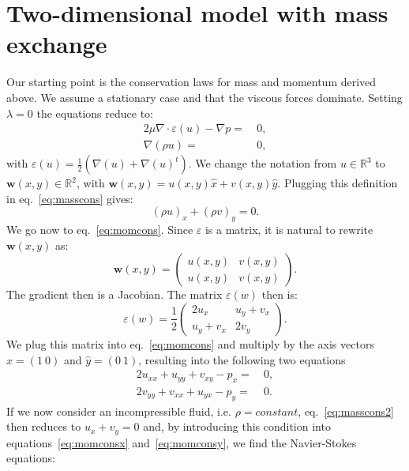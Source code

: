 \documentclass{article}
\begin{document}
\section{Two-dimensional model with mass exchange}
Our starting point is the conservation laws for mass and momentum derived above. We assume a stationary case and that the viscous forces dominate. Setting $\lambda = 0$ the equations reduce to:
\begin{align}
\label{eq:momcons}
2\mu \nabla \cdot \varepsilon(u) - \nabla p =&\ 0, \\
\label{eq:masscons}
\nabla (\rho u) =&\ 0,
\end{align}
with $\varepsilon(u) = \frac{1}{2}(\nabla(u) + \nabla(u)^{t})$. We change the notation from $u \in \mathbb{R}^{3}$ to $\textbf{w}(x,y) \in \mathbb{R}^{2}$, with $\textbf{w}(x,y) = u(x,y)\hat{x} + v(x,y)\hat{y}$. Plugging this definition in eq.~\eqref{eq:masscons} gives:
\begin{equation}
\label{eq:masscons2}
(\rho u)_{x} + (\rho v)_{y} = 0.
\end{equation}
We go now to eq.~\eqref{eq:momcons}. Since $\varepsilon$ is a matrix, it is natural to rewrite $\textbf{w}(x,y)$ as:
\begin{equation}
\textbf{w}(x,y) = \begin{pmatrix}
u(x,y) & v(x,y) \\
u(x,y) & v(x,y)
\end{pmatrix}.
\end{equation}
The gradient then is a Jacobian. The matrix $\varepsilon(w)$ then is:
\begin{equation}
\varepsilon(w) = \frac{1}{2}\begin{pmatrix}
2u_{x} & u_{y}+v_x \\
u_{y}+v_x & 2v_{y}
\end{pmatrix}.
\end{equation}
We plug this matrix into eq.~\eqref{eq:momcons} and multiply by the axis vectors $\hat{x} = (1\ 0)$ and $\hat{y} = (0\ 1)$, resulting into the following two equations
\begin{align}
\label{eq:momconsx}
2u_{xx} + u_{yy} + v_{xy} - p_{x} =&\ 0, \\
\label{eq:momconsy}
2v_{yy} + v_{xx} + u_{yx} - p_{y} =&\ 0.
\end{align}
If we now consider an incompressible fluid, i.e. $\rho = constant$, eq.~\eqref{eq:masscons2} then reduces to $u_{x} + v_{y} = 0$ and, by introducing this condition into equations~\eqref{eq:momconsx} and~\eqref{eq:momconsy}, we find the Navier-Stokes equations:
\end{document}
